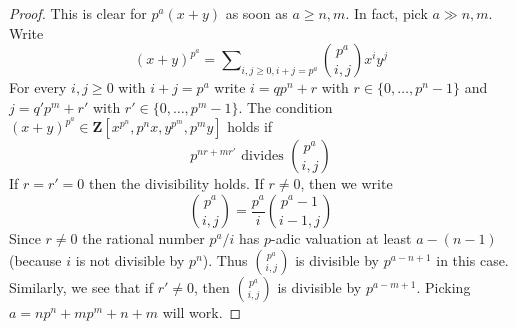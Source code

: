 \documentclass[10pt,a4paper]{amsart}
\theoremstyle{plain}
\theoremstyle{definition}
\theoremstyle{remark}
\numberwithin{equation}{subsection}
\begin{document}
\begin{proof}
This is clear for $p^a(x + y)$ as soon as $a \geq n, m$.
In fact, pick $a \gg n, m$. Write
$$
(x + y)^{p^a}  = \sum\nolimits_{i, j \geq 0, i + j = p^a}
{p^a \choose i, j} x^iy^j
$$
For every $i, j \geq 0$ with $i + j = p^a$ write
$i = q p^n + r$ with $r \in \{0, \ldots, p^n - 1\}$ and
$j = q' p^m + r'$ with $r' \in \{0, \ldots, p^m - 1\}$.
The condition $(x + y)^{p^a} \in \mathbf{Z}[x^{p^n}, p^nx, y^{p^m}, p^my]$
holds if
$$
p^{nr + mr'} \text{ divides } {p^a \choose i, j}
$$
If $r = r' = 0$ then the divisibility holds. If $r \not = 0$, then
we write
$$
{p^a \choose i, j} = \frac{p^a}{i} {p^a - 1 \choose i - 1, j}
$$
Since $r \not = 0$ the rational number $p^a/i$ has $p$-adic
valuation at least $a - (n - 1)$ (because $i$ is not divisible by $p^n$).
Thus ${p^a \choose i, j}$ is divisible by $p^{a - n + 1}$ in this case.
Similarly, we see that if $r' \not = 0$, then ${p^a \choose i, j}$ is
divisible by $p^{a - m + 1}$. Picking $a = np^n + mp^m + n + m$ will work.
\end{proof}
\end{document}
